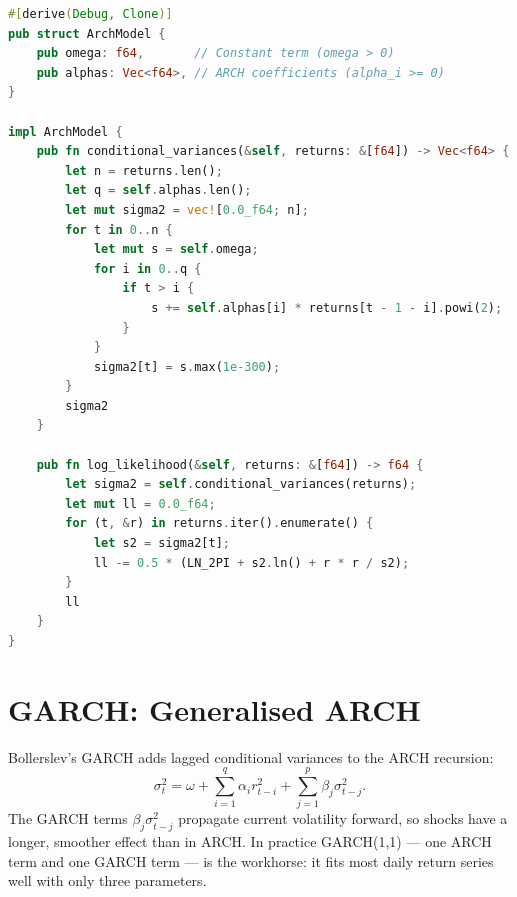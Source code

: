 \begin{lstlisting}[language=Rust]
#[derive(Debug, Clone)]
pub struct ArchModel {
    pub omega: f64,       // Constant term (omega > 0)
    pub alphas: Vec<f64>, // ARCH coefficients (alpha_i >= 0)
}

impl ArchModel {
    pub fn conditional_variances(&self, returns: &[f64]) -> Vec<f64> {
        let n = returns.len();
        let q = self.alphas.len();
        let mut sigma2 = vec![0.0_f64; n];
        for t in 0..n {
            let mut s = self.omega;
            for i in 0..q {
                if t > i {
                    s += self.alphas[i] * returns[t - 1 - i].powi(2);
                }
            }
            sigma2[t] = s.max(1e-300);
        }
        sigma2
    }

    pub fn log_likelihood(&self, returns: &[f64]) -> f64 {
        let sigma2 = self.conditional_variances(returns);
        let mut ll = 0.0_f64;
        for (t, &r) in returns.iter().enumerate() {
            let s2 = sigma2[t];
            ll -= 0.5 * (LN_2PI + s2.ln() + r * r / s2);
        }
        ll
    }
}
\end{lstlisting}

\section{GARCH: Generalised ARCH}


Bollerslev's GARCH adds lagged conditional variances to the ARCH recursion:
\[
\sigma_t^2 = \omega + \sum_{i=1}^q \alpha_i r_{t-i}^2
                   + \sum_{j=1}^p \beta_j \sigma_{t-j}^2.
\]
The GARCH terms $\beta_j \sigma_{t-j}^2$ propagate current volatility forward,
so shocks have a longer, smoother effect than in ARCH. In practice
GARCH(1,1) --- one ARCH term and one GARCH term --- is the workhorse: it fits
most daily return series well with only three parameters.

